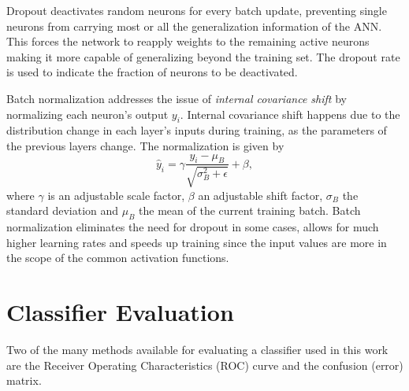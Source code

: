 Dropout \cite{DBLP:journals/corr/abs-1207-0580} deactivates random neurons for every batch update, preventing single neurons from carrying most or all the generalization information of the ANN. This forces the network to reapply weights to the remaining active neurons making it more capable of generalizing beyond the training set. The dropout rate is used to indicate the fraction of neurons to be deactivated.

Batch normalization \cite{DBLP:journals/corr/IoffeS15} addresses the issue of \emph{internal covariance shift} by normalizing each neuron's output $y_i$. Internal covariance shift happens due to the distribution change in each layer's inputs during training, as the parameters of the previous layers change. The normalization is given by
\begin{equation}
    \hat{y}_i=\gamma \frac{y_i - \mu_B}{\sqrt{\sigma_B^2 + \epsilon}}+\beta,
\end{equation}
where $\gamma$ is an adjustable scale factor, $\beta$ an adjustable shift factor, $\sigma_B$ the standard deviation and $\mu_B$ the mean of the current training batch. Batch normalization eliminates the need for dropout in some cases, allows for much higher learning rates and speeds up training since the input values are more in the scope of the common activation functions.

\section{Classifier Evaluation}
Two of the many methods available for evaluating a classifier used in this work are the Receiver Operating Characteristics (ROC) curve and the confusion (error) matrix.

